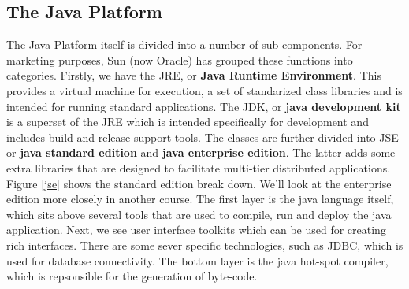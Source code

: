 \documentclass[10pt,a4paper]{article}
\begin{document}
\subsection{The Java Platform}
The Java Platform itself is divided into a number of sub components. For marketing purposes, Sun (now Oracle) has grouped these functions into categories. Firstly, we have the JRE, or {\bf Java Runtime Environment}. This provides a virtual machine for execution, a set of standarized class libraries and is intended for running standard applications. The JDK, or {\bf java development kit} is a superset of the JRE which is intended specifically for development and includes build and release support tools. The classes are further divided into JSE or {\bf java standard edition} and {\bf java enterprise edition}. The latter adds some extra libraries that are designed to facilitate multi-tier distributed applications. Figure \ref{jse} shows the standard edition break down. We'll look at the enterprise edition more closely in another course. 
\newline\newline
The first layer is the java language itself, which sits above several tools that are used to compile, run and deploy the java application. Next, we see user interface toolkits which can be used for creating rich interfaces. There are some sever specific technologies, such as JDBC, which is used for database connectivity. The bottom layer is the java hot-spot compiler, which is repsonsible for the generation of byte-code. 
\end{document}
